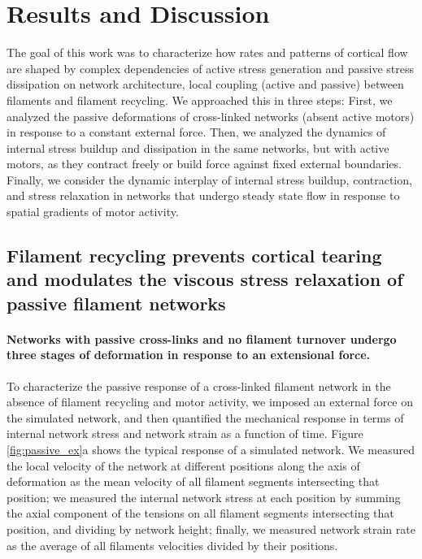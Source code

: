 \documentclass[10pt,letterpaper]{article}
\begin{document}
\section*{Results and Discussion}
The goal of this work was to characterize how rates and patterns of cortical flow are shaped by complex dependencies of active stress generation and passive stress dissipation on network architecture, local coupling (active and passive) between filaments and filament recycling.  We approached this in three steps: First, we analyzed the passive deformations of cross-linked networks (absent active motors) in response to a constant external force. Then, we analyzed the dynamics of internal stress buildup and dissipation in the same networks, but with active motors, as they contract freely or build force against fixed external boundaries. Finally, we consider the dynamic interplay of internal stress buildup, contraction, and stress relaxation in networks that undergo steady state flow in response to spatial gradients of motor activity.

\subsection*{Filament recycling prevents cortical tearing and modulates the viscous stress relaxation of passive filament networks}
 
\paragraph{Networks with passive cross-links and no filament turnover undergo three stages of deformation in response to an extensional force.} 

To characterize the passive response of a cross-linked filament network in the absence of filament recycling and motor activity, we imposed an external force on the simulated network, and then quantified the mechanical response in terms of internal network stress and network strain as a function of time. Figure \ref{fig:passive_ex}a shows the typical response of a simulated network. We measured the local velocity of the network at different positions along the axis of deformation as the mean velocity of all filament segments intersecting that position; we measured the internal network stress at each position by summing the axial component of the tensions on all filament segments intersecting that position, and dividing by network height; finally, we measured network strain rate as the average of all filaments velocities divided by their positions.
\end{document}
